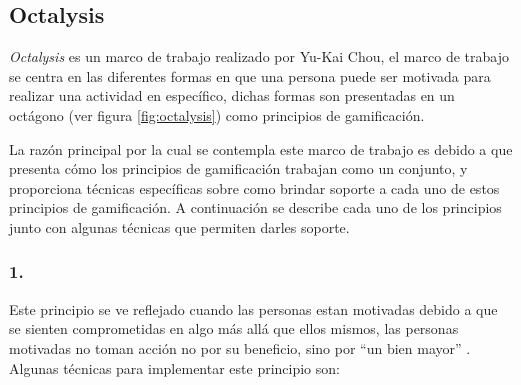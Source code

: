 \subsection{Octalysis}
\label{sec:octalysis}

 {\it Octalysis} es un marco de trabajo realizado por Yu-Kai Chou, el marco de trabajo
 se centra en las diferentes formas en que una persona puede ser motivada para realizar
 una actividad en específico, dichas formas son presentadas en un octágono (ver figura
 \ref{fig:octalysis}) como principios de gamificación.\\
 
    

 \noindent La razón principal por la cual se contempla este marco de trabajo es debido a que presenta
 cómo los principios de gamificación trabajan como un conjunto, y proporciona técnicas específicas
 sobre como brindar soporte a cada uno de estos principios de gamificación. A continuación se
 describe cada uno de los principios junto con algunas técnicas que permiten darles soporte.
    
\subsubsection{1. \principioI} \label{subsec:principioI}
  
 Este principio se ve reflejado cuando las personas estan motivadas debido a que se
 sienten comprometidas en algo más allá que ellos mismos, las personas motivadas no toman acción
 no por su beneficio, sino por ``un bien mayor'' \cite[p. 66, 69]{Octalysis}. Algunas técnicas
 para implementar este principio son:
    
